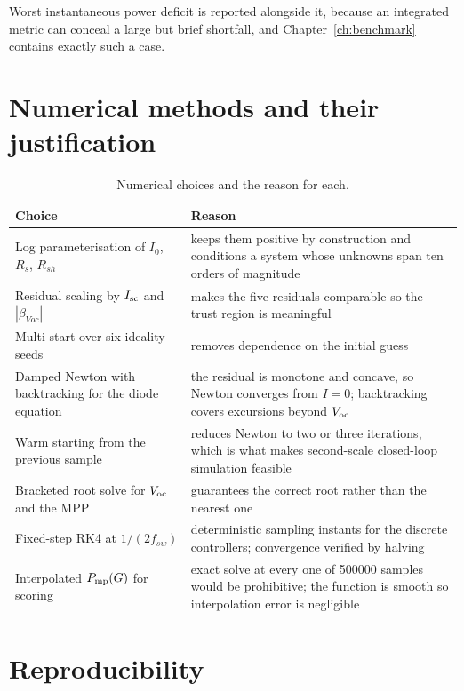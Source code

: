 Worst instantaneous power deficit is reported alongside it, because an
integrated metric can conceal a large but brief shortfall, and
Chapter~\ref{ch:benchmark} contains exactly such a case.

\section{Numerical methods and their justification}
\label{sec:numerics}

\begin{table}[htbp]
\centering
\caption{Numerical choices and the reason for each.}
\label{tab:numchoices}
\begin{tabular}{@{}L{0.30\textwidth}L{0.62\textwidth}@{}}
\toprule
\textbf{Choice} & \textbf{Reason} \\
\midrule
Log parameterisation of $I_0$, $R_s$, $R_{sh}$ & keeps them positive by construction and conditions a system whose unknowns span ten orders of magnitude \\
Residual scaling by $I_{\mathrm{sc}}$ and $|\beta_{Voc}|$ & makes the five residuals comparable so the trust region is meaningful \\
Multi-start over six ideality seeds & removes dependence on the initial guess \\
Damped Newton with backtracking for the diode equation & the residual is monotone and concave, so Newton converges from $I = 0$; backtracking covers excursions beyond $V_{\mathrm{oc}}$ \\
Warm starting from the previous sample & reduces Newton to two or three iterations, which is what makes second-scale closed-loop simulation feasible \\
Bracketed root solve for $V_{\mathrm{oc}}$ and the MPP & guarantees the correct root rather than the nearest one \\
Fixed-step RK4 at $1/(2f_{sw})$ & deterministic sampling instants for the discrete controllers; convergence verified by halving \\
Interpolated $P_{\mathrm{mp}}(G)$ for scoring & exact solve at every one of \num{500000} samples would be prohibitive; the function is smooth so interpolation error is negligible \\
\bottomrule
\end{tabular}
\end{table}

\section{Reproducibility}

